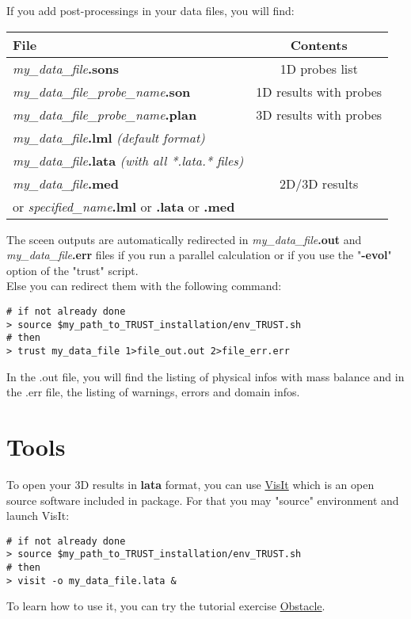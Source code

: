 If you add post-processings in your data files, you will find:

\begin{longtable}{|l|c|}
\hline \textbf{File}                                    & \textbf{Contents} \\ \hline \hline
\textit{my\_data\_file}\textbf{.sons}                          & 1D probes list \\ \hline
\textit{my\_data\_file\_probe\_name}\textbf{.son}              & 1D results with probes \\ \hline
\textit{my\_data\_file\_probe\_name}\textbf{.plan}             & 3D results with probes\\ \hline
\textit{my\_data\_file}\textbf{.lml} \textit{(default format)}             & \\
\textit{my\_data\_file}\textbf{.lata} \textit{(with all *.lata.* files)}   & \\
\textit{my\_data\_file}\textbf{.med}                                       & 2D/3D results \\
or \textit{specified\_name}\textbf{.lml} or \textbf{.lata} or \textbf{.med}  & \\ \hline
\end{longtable}

The sceen outputs are automatically redirected in \textit{my\_data\_file}\textbf{.out} and \textit{my\_data\_file}\textbf{.err} files if you run a parallel calculation or if you use the "\textbf{-evol}" option of the "trust" script.\\
Else you can redirect them with the following command:
\begin{verbatim}
# if not already done
> source $my_path_to_TRUST_installation/env_TRUST.sh
# then
> trust my_data_file 1>file_out.out 2>file_err.err
\end{verbatim}

In the .out file, you will find the listing of physical infos with mass balance and in the .err file, the listing of warnings, errors and domain infos.




\section{Tools}

To open your 3D results in \textbf{lata} format, you can use \href{https://wci.llnl.gov/simulation/computer-codes/visit}{VisIt} which is an open source software included in \trust package. For that you may "source" \trust environment and launch VisIt:
\begin{verbatim}
# if not already done
> source $my_path_to_TRUST_installation/env_TRUST.sh
# then
> visit -o my_data_file.lata &
\end{verbatim}
To learn how to use it, you can try the \trust tutorial exercise \href{TRUST_tutorial.pdf\#exo1}{Obstacle}. \\

